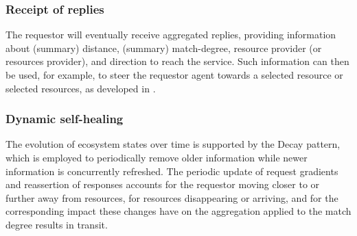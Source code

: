 \documentclass[12pt,a4paper,twoside,openright]{book}
\begin{document}
\subsubsection{Receipt of replies}
The requestor will eventually receive aggregated replies, providing information about (summary) distance, (summary) match-degree, resource provider (or resources provider), and direction to reach the service.
%
Such information can then be used, for example, to steer the requestor agent towards a selected resource or selected resources, as developed in \cite{sapereecolaws-sac2012}.

\subsubsection{Dynamic self-healing}
The evolution of ecosystem states over time is supported by the Decay pattern, which is employed to periodically remove older information while newer information is concurrently refreshed.
%
The periodic update of request gradients and reassertion of responses accounts for the requestor moving closer to or further away from resources, for resources disappearing or arriving, and for the corresponding impact these changes have on the aggregation applied to the match degree results in transit. 
\end{document}
